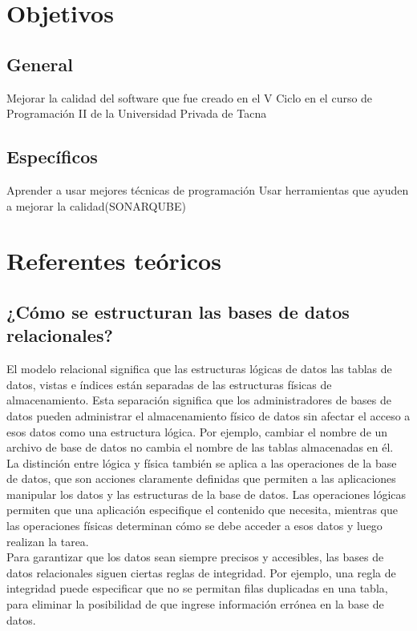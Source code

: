 \documentclass[12pt,letterpaper]{article}
\begin{document}
\section{Objetivos}
    \subsection{General}
    Mejorar la calidad del software que fue creado en el V Ciclo en el curso de Programación II de la Universidad Privada de Tacna
    \subsection{Específicos}
    Aprender a usar mejores técnicas de programación
    Usar herramientas que ayuden a mejorar la calidad(SONARQUBE)

\section{Referentes teóricos}
    \subsection{¿Cómo se estructuran las bases de datos relacionales?}
    El modelo relacional significa que las estructuras lógicas de datos las tablas de datos, vistas e índices están separadas de las estructuras físicas de almacenamiento. Esta separación significa que los administradores de bases de datos pueden administrar el almacenamiento físico de datos sin afectar el acceso a esos datos como una estructura lógica. Por ejemplo, cambiar el nombre de un archivo de base de datos no cambia el nombre de las tablas almacenadas en él. \\
    La distinción entre lógica y física también se aplica a las operaciones de la base de datos, que son acciones claramente definidas que permiten a las aplicaciones manipular los datos y las estructuras de la base de datos. Las operaciones lógicas permiten que una aplicación especifique el contenido que necesita, mientras que las operaciones físicas determinan cómo se debe acceder a esos datos y luego realizan la tarea.\\
    Para garantizar que los datos sean siempre precisos y accesibles, las bases de datos relacionales siguen ciertas reglas de integridad. Por ejemplo, una regla de integridad puede especificar que no se permitan filas duplicadas en una tabla, para eliminar la posibilidad de que ingrese información errónea en la base de datos.\\
\end{document}
